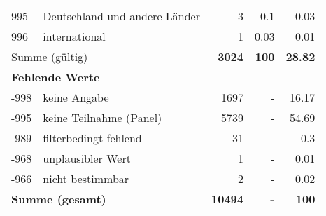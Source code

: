 \begin{longtable}{lXrrr}
        995 & \multicolumn{1}{X}{Deutschland und andere Länder} & %
          \num{3} &
          \num[round-mode=places,round-precision=2]{0,1} &
          \num[round-mode=places,round-precision=2]{0,03} \\

        996 & \multicolumn{1}{X}{international} & %
          \num{1} &
          \num[round-mode=places,round-precision=2]{0,03} &
          \num[round-mode=places,round-precision=2]{0,01} \\

     \midrule
     \multicolumn{2}{l}{Summe (gültig)} &
       \textbf{\num{3024}} &
     \textbf{100} &
       \textbf{\num[round-mode=places,round-precision=2]{28,82}} \\
     \multicolumn{5}{l}{\textbf{Fehlende Werte}}\\
       -998 &
       keine Angabe &
         \num{1697} &
        - &
         \num[round-mode=places,round-precision=2]{16,17} \\
       -995 &
       keine Teilnahme (Panel) &
         \num{5739} &
        - &
         \num[round-mode=places,round-precision=2]{54,69} \\
       -989 &
       filterbedingt fehlend &
         \num{31} &
        - &
         \num[round-mode=places,round-precision=2]{0,3} \\
       -968 &
       unplausibler Wert &
         \num{1} &
        - &
         \num[round-mode=places,round-precision=2]{0,01} \\
       -966 &
       nicht bestimmbar &
         \num{2} &
        - &
         \num[round-mode=places,round-precision=2]{0,02} \\
     \midrule
     \multicolumn{2}{l}{\textbf{Summe (gesamt)}} &
          \textbf{\num{10494}} &
        \textbf{-} &
        \textbf{100} \\
     \bottomrule
     \end{longtable}
     
